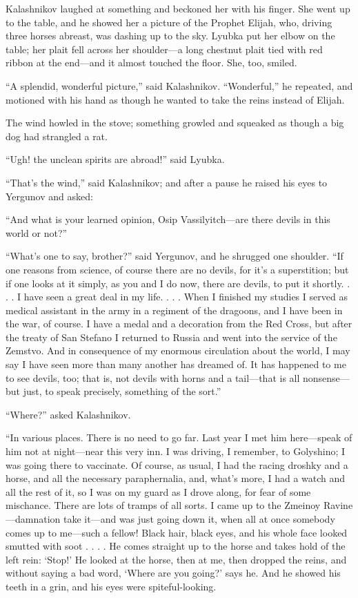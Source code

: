 Kalashnikov laughed at something and beckoned her with his finger. She
went up to the table, and he showed her a picture of the Prophet Elijah,
who, driving three horses abreast, was dashing up to the sky. Lyubka put
her elbow on the table; her plait fell across her shoulder—a long
chestnut plait tied with red ribbon at the end—and it almost touched the
floor. She, too, smiled.

“A splendid, wonderful picture,” said Kalashnikov. “Wonderful,” he
repeated, and motioned with his hand as though he wanted to take the
reins instead of Elijah.

The wind howled in the stove; something growled and squeaked as though a
big dog had strangled a rat.

“Ugh! the unclean spirits are abroad!” said Lyubka.

“That’s the wind,” said Kalashnikov; and after a pause he raised his
eyes to Yergunov and asked:

“And what is your learned opinion, Osip Vassilyitch—are there devils in
this world or not?”

“What’s one to say, brother?” said Yergunov, and he shrugged one
shoulder. “If one reasons from science, of course there are no devils,
for it’s a superstition; but if one looks at it simply, as you and I do
now, there are devils, to put it shortly. . . . I have seen a great deal
in my life. . . . When I finished my studies I served as medical
assistant in the army in a regiment of the dragoons, and I have been in
the war, of course. I have a medal and a decoration from the Red Cross,
but after the treaty of San Stefano I returned to Russia and went into
the service of the Zemstvo. And in consequence of my enormous
circulation about the world, I may say I have seen more than many
another has dreamed of. It has happened to me to see devils, too; that
is, not devils with horns and a tail—that is all nonsense—but just, to
speak precisely, something of the sort.”

“Where?” asked Kalashnikov.

“In various places. There is no need to go far. Last year I met him
here—speak of him not at night—near this very inn. I was driving, I
remember, to Golyshino; I was going there to vaccinate. Of course, as
usual, I had the racing droshky and a horse, and all the necessary
paraphernalia, and, what’s more, I had a watch and all the rest of it,
so I was on my guard as I drove along, for fear of some mischance. There
are lots of tramps of all sorts. I came up to the Zmeinoy
Ravine—damnation take it—and was just going down it, when all at once
somebody comes up to me—such a fellow! Black hair, black eyes, and his
whole face looked smutted with soot . . . . He comes straight up to the
horse and takes hold of the left rein: ‘Stop!’ He looked at the horse,
then at me, then dropped the reins, and without saying a bad word,
‘Where are you going?’ says he. And he showed his teeth in a grin, and
his eyes were spiteful-looking.

